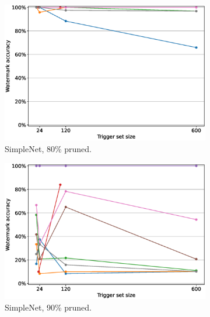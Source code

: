 \begin{figure}
    \centering
    \begin{subfigure}{0.4\linewidth}
        \includegraphics[width=\linewidth]{images/pruning/simplenet_mnist_pruning_per_arch_08.eps}
        \caption{SimpleNet, 80\% pruned.}
        \label{fig:pruning-0.8-simplenet}
    \end{subfigure}
    \quad
    \begin{subfigure}{0.4\linewidth}
        \includegraphics[width=\linewidth]{images/pruning/simplenet_mnist_pruning_per_arch_09.eps}
        \caption{SimpleNet, 90\% pruned.}
        \label{fig:pruning-0.9-simplenet}
    \end{subfigure}
    \quad
    \begin{subfigure}{0.4\linewidth}

\end{subfigure}
\end{figure}
